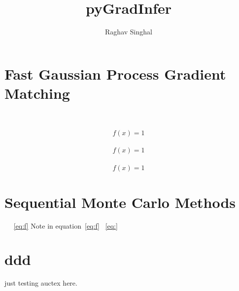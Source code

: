 \documentclass[12pt, letterpaper]{article}
\title{pyGradInfer}
\author{Raghav Singhal}
\begin{document}
\maketitle

\section{Fast Gaussian Process Gradient Matching}
~\label{sec:fgpgm}

\begin{align}
  \label{eq:f}
  f(x) = 1
\end{align}


\begin{align}
  \label{eq:g}
  f(x) = 1
\end{align}


\begin{align}
  \label{eq:h}
  f(x) = 1
\end{align}

\section{Sequential Monte Carlo Methods}
~\label{sec:sqmc}
~\ref{eq:f}
Note in equation~\ref{eq:f}
~\ref{eq:}
\section{ddd}


just testing auctex here.
\end{document}
